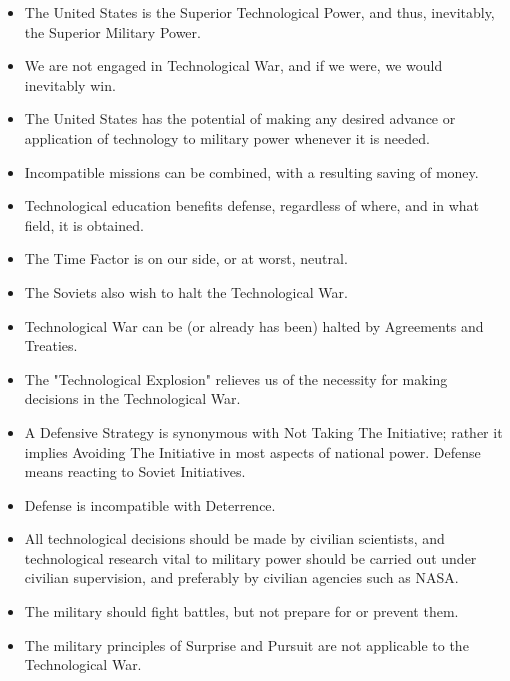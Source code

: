 \medskip

\begin{mdframed}[nobreak=true, frametitle={CHART THREE: Assumptions Governing U.S. Technological Strategy}]
        \begin{itemize}
            \item The United States is the Superior Technological Power, and thus, inevitably, the Superior Military Power.
            \item We are not engaged in Technological War, and if we were, we would inevitably win.
            \item The United States has the potential of making any desired advance or application of technology to military power whenever it is needed.
            \item Incompatible missions can be combined, with a resulting saving of money.
            \item Technological education benefits defense, regardless of where, and in what field, it is obtained.
            \item The Time Factor is on our side, or at worst, neutral.
            \item The Soviets also wish to halt the Technological War.
            \item Technological War can be (or already has been) halted by Agreements and Treaties.
            \item The "Technological Explosion" relieves us of the necessity for making decisions in the Technological War.
            \item A Defensive Strategy is synonymous with Not Taking The Initiative; rather it implies Avoiding The Initiative in most aspects of national power. Defense means reacting to Soviet Initiatives.
            \item Defense is incompatible with Deterrence.
            \item All technological decisions should be made by civilian scientists, and technological research vital to military power should be carried out under civilian supervision, and preferably by civilian agencies such as NASA.
            \item The military should fight battles, but not prepare for or prevent them.
            \item The military principles of Surprise and Pursuit are not applicable to the Technological War.
        \end{itemize}
\end{mdframed}   

